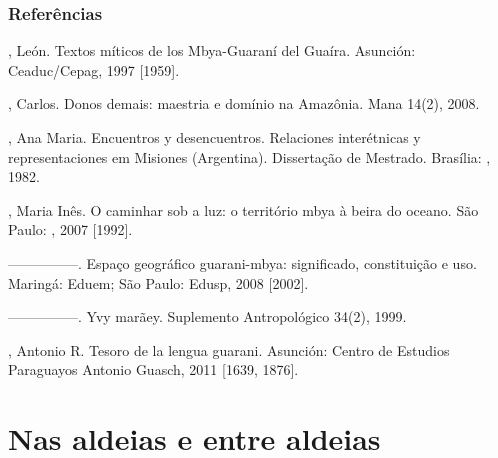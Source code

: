 \section{Referências}

\begin{Parskip}
, León. Textos míticos de los Mbya-Guaraní del Guaíra. Asunción:
Ceaduc/Cepag, 1997 [1959].

, Carlos. Donos demais: maestria e domínio na Amazônia. Mana
14(2), 2008. 

 , Ana Maria. Encuentros y desencuentros. Relaciones
interétnicas y representaciones em Misiones (Argentina). Dissertação de
Mestrado. Brasília: , 1982.

, Maria Inês.  O caminhar sob a luz: o território mbya à beira do
oceano. São Paulo: , 2007 [1992].

—————. Espaço geográfico guarani-mbya: significado, constituição e uso.
Maringá: Eduem; São Paulo: Edusp, 2008 [2002].

—————. Yvy marãey. Suplemento Antropológico 34(2), 1999.

, Antonio R. Tesoro de la lengua guarani. Asunción: Centro de
Estudios Paraguayos Antonio Guasch, 2011 [1639, 1876].
\end{Parskip}

\part{Nas aldeias e entre aldeias}

